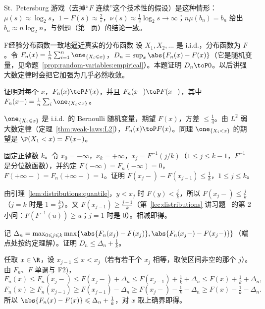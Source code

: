\begin{probleme}
\begin{questions}
\begin{solution}
St.\ Petersburg 游戏（去掉“$F$ 连续”这个技术性的假设）是这种情形：$\mu(s)\approx\log_2s$，$1-F(s)\approx\frac2s$，$\nu(s)\approx\frac12\log_2s\to\infty$；$n\mu(b_n)=b_n$ 给出 $b_n\approx n\log_2n$，与例题（第~\pageref{we:weak-laws:st-petersburg} 页）的结论一致。
\end{solution}
\end{questions}
\end{probleme}


\begin{probleme}{F}{经验分布函数一致地逼近真实的分布函数}
设 $X_1,X_2,\dots$ 是 i.i.d.，分布函数为 $F$。令 $F_n(x)=\frac1n\sum_{i=1}^n\one_{\{X_i\leqslant x\}}$，$D_n=\sup_x\abs{F_n(x)-F(x)}$（它是随机变量，见命题~\ref{prop:random-variables:empirical}）。本题证明 $D_n\toP0$。以后讲强大数定律时会把它加强为几乎必然收敛。
\begin{questions}
\item 证明对每个 $x$，$F_n(x)\toP F(x)$，并且 $F_n(x-)\toP F(x-)$，其中 $F_n(x-)=\frac1n\sum_i\one_{\{X_i<x\}}$。
\begin{solution}
$\one_{\{X_i\leqslant x\}}$ 是 i.i.d.\ 的 Bernoulli 随机变量，期望 $F(x)$，方差 $\leqslant\frac14$。由 $L^2$ 弱大数定律（定理~\ref{thm:weak-laws:L2}），$F_n(x)\toP F(x)$。同理 $\one_{\{X_i<x\}}$ 的期望是 $\P(X_1<x)=F(x-)$。
\end{solution}
\item 固定正整数 $k$。令 $x_0=-\infty$，$x_k=+\infty$，$x_j=F^{-1}(j/k)$（$1\leqslant j\leqslant k-1$，$F^{-1}$ 是分位数函数），并约定 $F(-\infty)=F_n(-\infty)=0$，$F(+\infty-)=F_n(+\infty-)=1$。证明 $F(x_j-)-F(x_{j-1})\leqslant\frac1k$，$1\leqslant j\leqslant k$。
\begin{solution}
由引理~\ref{lem:distributions:quantile}，$y<x_j$ 时 $F(y)<\frac jk$，所以 $F(x_j-)\leqslant\frac jk$（$j=k$ 时是 $1=\frac kk$）。又 $F(x_{j-1})\geqslant\frac{j-1}k$（第~\ref{lec:distributions} 讲习题~ 的第 2 小问：$F(F^{-1}(u))\geqslant u$；$j=1$ 时是 $0$）。相减即得。
\end{solution}
\item 记 $\Delta_n=\max_{0\leqslant j\leqslant k}\max\{\abs{F_n(x_j)-F(x_j)},\abs{F_n(x_j-)-F(x_j-)}\}$（端点处按约定理解）。证明 $D_n\leqslant\Delta_n+\frac1k$。
\begin{solution}
任取 $x\in\R$，设 $x_{j-1}\leqslant x<x_j$（若有若干个 $x_j$ 相等，取使区间非空的那个 $j$）。由 $F_n$、$F$ 单调与 F2)，
\[
F_n(x)\leqslant F_n(x_j-)\leqslant F(x_j-)+\Delta_n\leqslant F(x_{j-1})+\tfrac1k+\Delta_n\leqslant F(x)+\tfrac1k+\Delta_n,
\]
\[
F_n(x)\geqslant F_n(x_{j-1})\geqslant F(x_{j-1})-\Delta_n\geqslant F(x_j-)-\tfrac1k-\Delta_n\geqslant F(x)-\tfrac1k-\Delta_n .
\]
所以 $\abs{F_n(x)-F(x)}\leqslant\Delta_n+\frac1k$，对 $x$ 取上确界即得。


\end{solution}
\end{questions}
\end{probleme}
